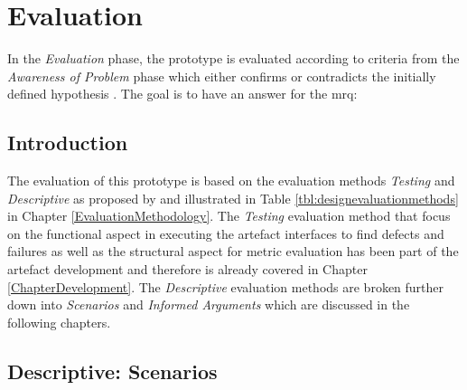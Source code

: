 
\chapter{Evaluation}

\label{ChapterEvaluation}

In the \textit{Evaluation} phase, the prototype is evaluated according to criteria from the \textit{Awareness of Problem} phase which either confirms or contradicts the initially defined hypothesis \citep{Vaishnavi2008}. The goal is to have an answer for the \gls{mrq}:
\begin{framed}
	\textit{\mrqtext}
\end{framed}


\section{Introduction}

The evaluation of this prototype is based on the evaluation methods \textit{Testing} and \textit{Descriptive} as proposed by \cite{Hevner2004} and illustrated in Table \ref{tbl:designevaluationmethods} in Chapter \ref{EvaluationMethodology}. The \textit{Testing} evaluation method that focus on the functional aspect in executing the artefact interfaces to find defects and failures as well as the structural aspect for metric evaluation has been part of the artefact development and therefore is already covered in Chapter \ref{ChapterDevelopment}. The \textit{Descriptive} evaluation methods are broken further down into \textit{Scenarios} and \textit{Informed Arguments} which are discussed in the following chapters.



\section{Descriptive: Scenarios}


